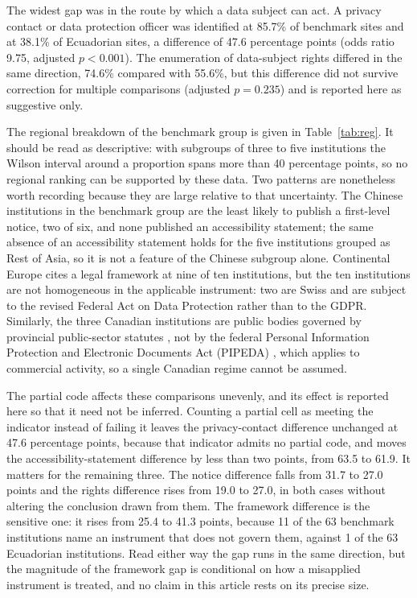 \documentclass[]{interact}
\begin{document}
The widest gap was in the route by which a data subject can act. A privacy contact or data protection officer was identified at 85.7\% of benchmark sites and at 38.1\% of Ecuadorian sites, a difference of 47.6 percentage points (odds ratio 9.75, adjusted $p<0.001$). The enumeration of data-subject rights differed in the same direction, 74.6\% compared with 55.6\%, but this difference did not survive correction for multiple comparisons (adjusted $p=0.235$) and is reported here as suggestive only.

The regional breakdown of the benchmark group is given in Table~\ref{tab:reg}. It should be read as descriptive: with subgroups of three to five institutions the Wilson interval around a proportion spans more than 40 percentage points, so no regional ranking can be supported by these data. Two patterns are nonetheless worth recording because they are large relative to that uncertainty. The Chinese institutions in the benchmark group are the least likely to publish a first-level notice, two of six, and none published an accessibility statement; the same absence of an accessibility statement holds for the five institutions grouped as Rest of Asia, so it is not a feature of the Chinese subgroup alone. Continental Europe cites a legal framework at nine of ten institutions, but the ten institutions are not homogeneous in the applicable instrument: two are Swiss and are subject to the revised Federal Act on Data Protection \citep{fadp_ch} rather than to the GDPR. Similarly, the three Canadian institutions are public bodies governed by provincial public-sector statutes \citep{fippa_on,fippa_bc,quebec_privacy}, not by the federal Personal Information Protection and Electronic Documents Act (PIPEDA) \citep{pipeda2000}, which applies to commercial activity, so a single Canadian regime cannot be assumed.

The partial code affects these comparisons unevenly, and its effect is reported here so that it need not be inferred. Counting a partial cell as meeting the indicator instead of failing it leaves the privacy-contact difference unchanged at 47.6 percentage points, because that indicator admits no partial code, and moves the accessibility-statement difference by less than two points, from 63.5 to 61.9. It matters for the remaining three. The notice difference falls from 31.7 to 27.0 points and the rights difference rises from 19.0 to 27.0, in both cases without altering the conclusion drawn from them. The framework difference is the sensitive one: it rises from 25.4 to 41.3 points, because 11 of the 63 benchmark institutions name an instrument that does not govern them, against 1 of the 63 Ecuadorian institutions. Read either way the gap runs in the same direction, but the magnitude of the framework gap is conditional on how a misapplied instrument is treated, and no claim in this article rests on its precise size.
\end{document}
